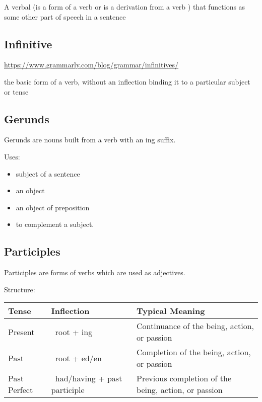 \documentclass{book}
\begin{document}
A verbal (is a form of a verb or is a derivation from a verb ) that functions as some other part of speech in a sentence

\subsection{Infinitive}

\url{https://www.grammarly.com/blog/grammar/infinitives/}

the basic form of a verb, without an inflection binding it to a particular subject or tense

\subsection{Gerunds}

Gerunds are nouns built from a verb with an ing suffix.

Uses:
\begin{itemize}
	\item subject of a sentence
	\item an object
	\item an object of preposition
	\item to complement a subject.
\end{itemize}

\subsection{Participles}

Participles are forms of verbs which are used as adjectives.

Structure:

\begin{table}[h!] %
	\setlength\tabcolsep{3pt} %
	\renewcommand{\arraystretch}{1.2} %
	\centering %
	\begin{tabular}{@{}>{\raggedright\arraybackslash}p{2.5cm}%
		>{\raggedright\arraybackslash}p{3cm}%
		>{\raggedright\arraybackslash}p{6cm}@{}}
		\toprule
		\textbf{Tense} & \textbf{Inflection}           & \textbf{Typical Meaning}                             \\
		\midrule
		Present        & ~root + ing                   & Continuance of the being, action, or passion         \\
		Past           & ~root + ed/en                 & Completion of the being, action, or passion          \\
		Past Perfect   & ~had/having + past participle & Previous completion of the being, action, or passion \\
		\bottomrule
	\end{tabular}
	\label{tab:tenses}
\end{table}
\end{document}
